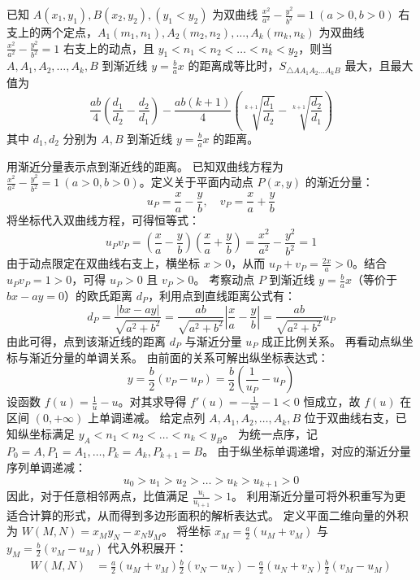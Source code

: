 \begin{example}
已知 \(A(x_1,y_1), B(x_2,y_2), (y_1<y_2)\) 为双曲线 \(\frac{x^2}{a^2}-\frac{y^2}{b^2}=1\ (a>0,b>0)\) 右支上的两个定点，\(A_1(m_1,n_1), A_2(m_2,n_2),\dots,A_k(m_k,n_k)\) 为双曲线 \(\frac{x^2}{a^2}-\frac{y^2}{b^2}=1\) 右支上的动点，且 \(y_1<n_1<n_2<\dots<n_k<y_2\)，则当 \(A,A_1,A_2,\dots,A_k,B\) 到渐近线 \(y=\frac{b}{a}x\) 的距离成等比时，\(S_{\triangle AA_1A_2\dots A_kB}\) 最大，且最大值为\[\frac{ab}{4}\left(\frac{d_1}{d_2}-\frac{d_2}{d_1}\right)-\frac{ab(k+1)}{4}\left(\sqrt[k+1]{\frac{d_1}{d_2}}-\sqrt[k+1]{\frac{d_2}{d_1}}\right)\]
其中 \(d_1,d_2\) 分别为 \(A,B\) 到渐近线 \(y=\frac{b}{a}x\) 的距离。
\end{example}
\begin{solution}
用渐近分量表示点到渐近线的距离。
已知双曲线方程为 $\frac{x^2}{a^2} - \frac{y^2}{b^2} = 1\ (a>0, b>0)$。定义关于平面内动点 $P(x, y)$ 的渐近分量：
\[ u_P = \frac{x}{a} - \frac{y}{b}, \quad v_P = \frac{x}{a} + \frac{y}{b} \]
将坐标代入双曲线方程，可得恒等式：
\[ u_P v_P = \left(\frac{x}{a} - \frac{y}{b}\right)\left(\frac{x}{a} + \frac{y}{b}\right) = \frac{x^2}{a^2} - \frac{y^2}{b^2} = 1 \]
由于动点限定在双曲线右支上，横坐标 $x > 0$，从而 $u_P + v_P = \frac{2x}{a} > 0$。结合 $u_P v_P = 1 > 0$，可得 $u_P > 0$ 且 $v_P > 0$。
考察动点 $P$ 到渐近线 $y = \frac{b}{a}x$（等价于 $bx - ay = 0$）的欧氏距离 $d_P$，利用点到直线距离公式有：
\[ d_P = \frac{|bx - ay|}{\sqrt{a^2 + b^2}} = \frac{ab}{\sqrt{a^2 + b^2}} \left| \frac{x}{a} - \frac{y}{b} \right| = \frac{ab}{\sqrt{a^2 + b^2}} u_P \]
由此可得，点到该渐近线的距离 $d_P$ 与渐近分量 $u_P$ 成正比例关系。
再看动点纵坐标与渐近分量的单调关系。
由前面的关系可解出纵坐标表达式：
\[ y = \frac{b}{2}(v_P - u_P) = \frac{b}{2} \left( \frac{1}{u_P} - u_P \right) \]
设函数 $f(u) = \frac{1}{u} - u$。对其求导得 $f'(u) = -\frac{1}{u^2} - 1 < 0$ 恒成立，故 $f(u)$ 在区间 $(0, +\infty)$ 上单调递减。
给定点列 $A, A_1, A_2, \dots, A_k, B$ 位于双曲线右支，已知纵坐标满足 $y_A < n_1 < n_2 < \dots < n_k < y_B$。
为统一点序，记 $P_0 = A, P_1 = A_1, \dots, P_k = A_k, P_{k+1} = B$。
由于纵坐标单调递增，对应的渐近分量序列单调递减：
\[ u_0 > u_1 > u_2 > \dots > u_k > u_{k+1} > 0 \]
因此，对于任意相邻两点，比值满足 $\frac{u_i}{u_{i+1}} > 1$。
利用渐近分量可将外积重写为更适合计算的形式，从而得到多边形面积的解析表达式。
定义平面二维向量的外积为 $W(M, N) = x_M y_N - x_N y_M$。
将坐标 $x_M = \frac{a}{2}(u_M + v_M)$ 与 $y_M = \frac{b}{2}(v_M - u_M)$ 代入外积展开：
\begin{align*}
W(M, N) &= \frac{a}{2} (u_M + v_M) \frac{b}{2} (v_N - u_N) - \frac{a}{2} (u_N + v_N) \frac{b}{2} (v_M - u_M) \\

\end{align*}
\end{solution}
